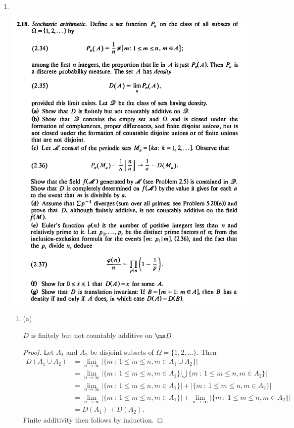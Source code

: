 \begin{enumerate}
\newpage
\item~\\
  \begin{mdframed}
    \includegraphics[width=400pt]{img/analysis--berkeley-202a-hw-b476.png}
  \end{mdframed}

  \begin{enumerate}[label=(\alph*)]

  \item (a)
    \begin{claim*}
      $D$ is finitely but not countably additive on $\ms D$.
    \end{claim*}
    \begin{proof}
      Let $A_1$ and $A_2$ be disjoint subsets of $\Omega = \{1, 2, \ldots\}$. Then
      \begin{align*}
        D(A_1 \cup A_2)
        &= \lim_{n\to\infty} \big|\big\{m ~:~ 1 \leq m \leq n, m \in A_1 \cup A_2 \big\}\big| \\
        &= \lim_{n\to\infty} \big|\big\{m ~:~ 1 \leq m \leq n, m \in A_1 \big\} \bigcup \big\{m ~:~ 1 \leq m \leq n, m \in A_2 \big\}\big|\\
        &= \lim_{n\to\infty} \big|\big\{m ~:~ 1 \leq m \leq n, m \in A_1 \big\}\big| + \big|\big\{m ~:~ 1 \leq m \leq n, m \in A_2 \big\}\big| \\
        &= \lim_{n\to\infty} \big|\big\{m ~:~ 1 \leq m \leq n, m \in A_1 \big\}\big| + \lim_{n\to\infty} \big|\big\{m ~:~ 1 \leq m \leq n, m \in A_2 \big\}\big| \\
        &= D(A_1) + D(A_2).
      \end{align*}
      Finite additivity then follows by induction. 


\end{proof}
\end{enumerate}
\end{enumerate}
